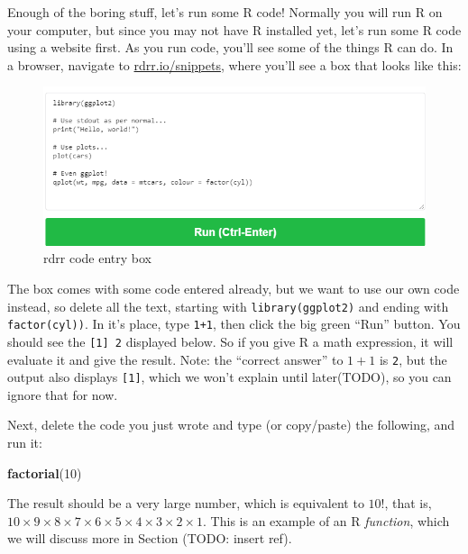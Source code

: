 \documentclass[
]{book}
\newenvironment{Shaded}{\begin{snugshade}}{\end{snugshade}}
\newcommand{\DecValTok}[1]{\textcolor[rgb]{0.00,0.00,0.81}{#1}}
\newcommand{\KeywordTok}[1]{\textcolor[rgb]{0.13,0.29,0.53}{\textbf{#1}}}
\newcommand{\NormalTok}[1]{#1}
\begin{document}
Enough of the boring stuff, let's run some R code!
Normally you will run R on your computer, but since you may not have R installed yet, let's run some R code using a website first.
As you run code, you'll see some of the things R can do.
In a browser, navigate to \href{https://rdrr.io/snippets/}{rdrr.io/snippets}, where you'll see a box that looks like this:

\begin{figure}

{\centering \includegraphics{src/images/rdrr} 

}

\caption{rdrr code entry box}\label{fig:unnamed-chunk-10}
\end{figure}

The box comes with some code entered already, but we want to use our own code instead, so delete all the text, starting with \texttt{library(ggplot2)} and ending with \texttt{factor(cyl))}.
In it's place, type \texttt{1+1}, then click the big green ``Run'' button.
You should see the \texttt{{[}1{]}\ 2} displayed below.
So if you give R a math expression, it will evaluate it and give the result.
Note: the ``correct answer'' to \(1+1\) is \texttt{2}, but the output also displays \texttt{{[}1{]}}, which we won't explain until later(TODO), so you can ignore that for now.

Next, delete the code you just wrote and type (or copy/paste) the following, and run it:

\begin{Shaded}
\begin{Highlighting}[]
\KeywordTok{factorial}\NormalTok{(}\DecValTok{10}\NormalTok{)}
\end{Highlighting}
\end{Shaded}

The result should be a very large number, which is equivalent to \(10!\), that is, \(10\times9\times8\times7\times6\times5\times4\times3\times2\times1\).
This is an example of an R \emph{function}, which we will discuss more in Section (TODO: insert ref).
\end{document}
